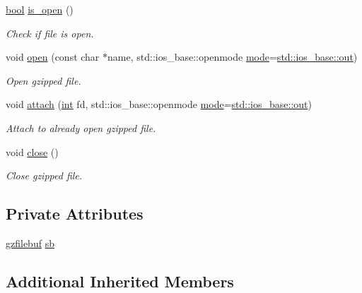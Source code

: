 \begin{DoxyCompactItemize}
\item 
\mbox{\hyperlink{libretro_8h_a4a26dcae73fb7e1528214a068aca317e}{bool}} \mbox{\hyperlink{classgzofstream_acb1c9c6dccaf41bc5e44c2263ea48de3}{is\+\_\+open}} ()
\begin{DoxyCompactList}\small\item\em Check if file is open. \end{DoxyCompactList}\item 
void \mbox{\hyperlink{classgzofstream_aee3eb31f07eda7f5ad1f60d59ea4b239}{open}} (const char $\ast$name, std\+::ios\+\_\+base\+::openmode \mbox{\hyperlink{ioapi_8h_a7e43d41c2fe013a373b540cba02505cf}{mode}}=\mbox{\hyperlink{gun_8c_acb2d4658684492100bc328998f52ae82}{std\+::ios\+\_\+base\+::out}})
\begin{DoxyCompactList}\small\item\em Open gzipped file. \end{DoxyCompactList}\item 
void \mbox{\hyperlink{classgzofstream_a95b76eaecd03b6cbf53d2f4b1c867439}{attach}} (\mbox{\hyperlink{ioapi_8h_a787fa3cf048117ba7123753c1e74fcd6}{int}} fd, std\+::ios\+\_\+base\+::openmode \mbox{\hyperlink{ioapi_8h_a7e43d41c2fe013a373b540cba02505cf}{mode}}=\mbox{\hyperlink{gun_8c_acb2d4658684492100bc328998f52ae82}{std\+::ios\+\_\+base\+::out}})
\begin{DoxyCompactList}\small\item\em Attach to already open gzipped file. \end{DoxyCompactList}\item 
void \mbox{\hyperlink{classgzofstream_a59e8b01e1c9741085f18ca456c4b8f54}{close}} ()
\begin{DoxyCompactList}\small\item\em Close gzipped file. \end{DoxyCompactList}\end{DoxyCompactItemize}
\subsection*{Private Attributes}
\begin{DoxyCompactItemize}
\item 
\mbox{\hyperlink{classgzfilebuf}{gzfilebuf}} \mbox{\hyperlink{classgzofstream_a33c8d570f3753ed277eacba50c76badc}{sb}}
\end{DoxyCompactItemize}
\subsection*{Additional Inherited Members}


